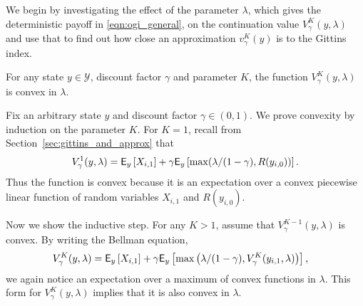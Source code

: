 We begin by investigating the effect of the parameter $\lambda$, which gives the deterministic payoff in \eqref{eqn:ogi_general}, on the continuation value $V^K_\gamma(y, \lambda)$ and use that to find out how close an approximation $v^K_\gamma(y)$ is to the Gittins index.
\begin{fact}\label{fact:v_is_convex}
	For any state $y \in \mathcal{Y}$, discount factor $\gamma$ and parameter $K$, the function $V^K_\gamma(y,\lambda)$ is convex in $\lambda$.%
\end{fact}
\begin{myproof}[Proof.]
	Fix an arbitrary state $y$ and discount factor $\gamma \in (0,1)$. We prove convexity by induction on the parameter $K$. For $K = 1$, recall from Section~\ref{sec:gittins_and_approx} that
	\begin{align*}
	V^1_\gamma(y, \lambda) = \mathsf{E}_y\left[X_{i,1} \right] +  \gamma \mathsf{E}_y\left[\max(\lambda/(1-\gamma), R(y_{i,0}))\right].
	\end{align*}
	Thus the function is convex because it is an expectation over a convex piecewise linear function of random variables $X_{i,1}$ and $R(y_{i,0})$. 
	
	Now we show the inductive step. For any $K > 1$, assume that $V^{K-1}_\gamma(y, \lambda)$ is convex. By writing the Bellman equation,
	\begin{align*}
	V^K_\gamma(y, \lambda) & = \mathsf{E}_y\left[X_{i,1}\right] + \gamma \mathsf{E}_y\left[\max\left(\lambda/(1-\gamma), V^K_\gamma(y_{i,1}, \lambda)\right) \right],
	\end{align*}
	we again notice an expectation over a maximum of convex functions in $\lambda$. This form for $V^K_\gamma(y, \lambda)$ implies that  it is also convex in $\lambda$.%
\end{myproof}

